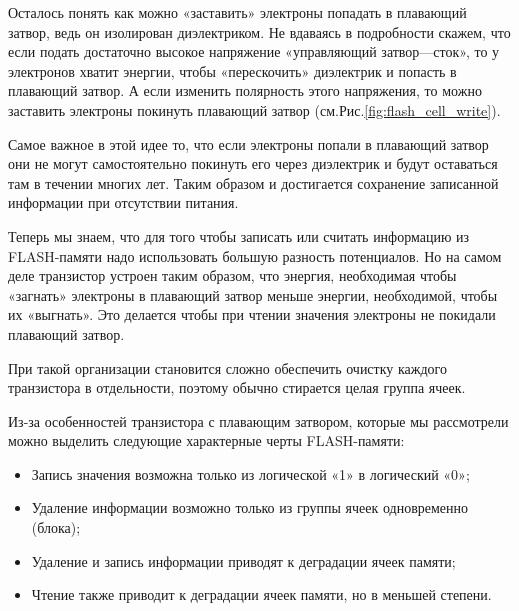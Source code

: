 \documentclass[a5paper, DIV=14, headings=openany, twoside=true,fontsize=10pt, titlepage]{scrreprt}
\newcommand{\quotes}[1]{«#1»}
\newcommand{\eng}[1]{\foreignlanguage{english}{#1}}
\begin{document}
\par{Осталось понять как можно \quotes{заставить} электроны попадать в плавающий затвор, ведь он изолирован диэлектриком. Не вдаваясь в подробности скажем, что если подать достаточно высокое напряжение \quotes{управляющий затвор---сток}, то у электронов хватит энергии, чтобы \quotes{перескочить} диэлектрик и попасть в плавающий затвор. А если изменить полярность этого напряжения, то можно заставить электроны покинуть плавающий затвор (см.Рис.\ref{fig:flash_cell_write}).}

% 

\par{Самое важное в этой идее то, что если электроны попали в плавающий затвор они не могут самостоятельно покинуть его через диэлектрик и будут оставаться там в течении многих лет. Таким образом и достигается сохранение записанной информации при отсутствии питания.}

\par{Теперь мы знаем, что для того чтобы записать или считать информацию из \eng{FLASH}-памяти надо использовать большую разность потенциалов. Но на самом деле транзистор устроен таким образом, что энергия, необходимая чтобы \quotes{загнать} электроны в плавающий затвор меньше энергии, необходимой, чтобы их \quotes{выгнать}. Это делается чтобы при чтении значения электроны не покидали плавающий затвор.}

\par{При такой организации становится сложно обеспечить очистку каждого транзистора в отдельности, поэтому обычно стирается целая группа ячеек.}

\par{Из-за особенностей транзистора с плавающим затвором, которые мы рассмотрели можно выделить следующие характерные черты \eng{FLASH}-памяти:
\begin{itemize}
  \item Запись значения возможна только из логической \quotes{1} в логический \quotes{0};
  \item Удаление информации возможно только из группы ячеек одновременно (блока);
  \item Удаление и запись информации приводят к деградации ячеек памяти;
  \item Чтение также приводит к деградации ячеек памяти, но в меньшей степени.
\end{itemize}}
\end{document}
